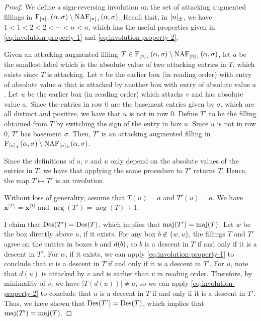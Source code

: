 \begin{proof}
	We define a sign-reversing involution on the set of attacking augmented fillings in \(\Fill[\interval{n}_\pm](\alpha, \sigma) \setminus \NAF[\interval{n}_\pm](\alpha, \sigma)\).
	Recall that, in \([n]_\pm\), we have \( 1 < \bar{1} < 2 < \bar{2} < \cdots < n < \bar{n}\), which has the useful properties given in \eqref{eq:involution-property-1} and \eqref{eq:involution-property-2}.

	Given an attacking augmented filling \(T \in \Fill[\interval{n}_\pm](\alpha, \sigma) \setminus \NAF[\interval{n}_\pm](\alpha, \sigma)\),
	let \(a\) be the smallest label which is the absolute value of two attacking entries in \(T\), which exists since \(T\) is attacking.
	Let \(v\) be the earlier box (in reading order) with entry of absolute value \(a\) that is attacked by another box with entry of absolute value \(a\).
	Let \(u\) be the earlier box (in reading order) which attacks \(v\) and has absolute value \(a\).
	Since the entries in row \(0\) are the basement entries given by \(\sigma\), which are all distinct and positive, we have that \(u\) is not in row \(0\).
	Define \(T'\) to be the filling obtained from \(T\) by switching the sign of the entry in box \(u\).
	Since \(u\) is not in row \(0\), \(T'\) has basement \(\sigma\).
	Then, \(T'\) is an attacking augmented filling in \(\Fill[\interval{n}_\pm](\alpha, \sigma) \setminus \NAF[\interval{n}_\pm](\alpha, \sigma)\).

	Since the definitions of \(a\), \(v\) and \(u\) only depend on the absolute values of the entries in \(T\),
	we have that applying the same procedure to \(T'\) returns \(T\).
	Hence, the map \(T \mapsto T'\) is an involution.

	Without loss of generality, assume that \(T(u) = a\) and \(T'(u) = \bar{a}\).
	We have \(\mathbf{x}^{|T'|} = \mathbf{x}^{|T|}\) and \(\operatorname{neg}(T') = \operatorname{neg}(T) + 1\).

	I claim that \(\Des(T') = \Des(T)\), which implies that \(\maj(T') = \maj(T)\).
	Let \(w\) be the box directly above \(u\), if it exists.
	For any box \(b \notin \{w, u\}\), the fillings \(T\) and \(T'\) agree on the entries in boxes \(b\) and \(d(b)\),
	so \(b\) is a descent in \(T\) if and only if it is a descent in \(T'\).
	For \(w\), if it exists, we can apply \eqref{eq:involution-property-1} to conclude that \(w\) is a descent in \(T\) if and only if it is a descent in \(T'\).
	For \(u\), note that \( d(u) \) is attacked by \(v\) and is earlier than \(v\) in reading order.
	Therefore, by minimality of \(v\), we have \(|T(d(u))| \neq a\), so we can apply \eqref{eq:involution-property-2} to conclude that \(u\) is a descent in \(T\) if and only if it is a descent in \(T'\).
	Thus, we have shown that \(\Des(T') = \Des(T)\), which implies that \(\maj(T') = \maj(T)\).


\end{proof}
